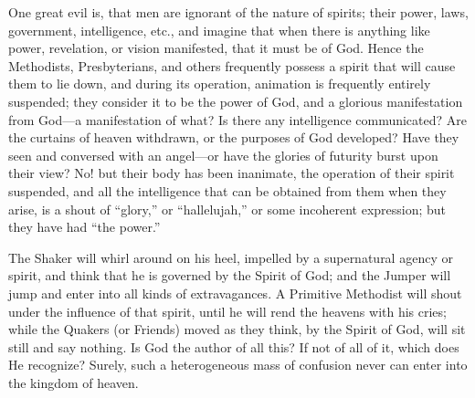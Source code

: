One great evil is, that men are ignorant of the nature of spirits; their power, laws,
government, intelligence, etc., and imagine that when there is anything like power,
revelation, or vision manifested, that it must be of God. Hence the Methodists, Presbyterians,
and others frequently possess a spirit that will cause them to lie down, and during its
operation, animation is frequently entirely suspended; they consider it to be the power of
God, and a glorious manifestation from God—a manifestation of what? Is there any
intelligence communicated? Are the curtains of heaven withdrawn, or the purposes of God
developed? Have they seen and conversed with an angel—or have the glories of futurity
burst upon their view? No! but their body has been inanimate, the operation of their spirit
suspended, and all the intelligence that can be obtained from them when they arise, is a shout
of ``glory,'' or ``hallelujah,'' or some incoherent expression; but they have had ``the power.''

The Shaker will whirl around on his heel, impelled by a supernatural agency or spirit, and
think that he is governed by the Spirit of God; and the Jumper will jump and enter into all
kinds of extravagances. A Primitive Methodist will shout under the influence of that spirit,
until he will rend the heavens with his cries; while the Quakers (or Friends) moved as they
think, by the Spirit of God, will sit still and say nothing. Is God the author of all this? If not
of all of it, which does He recognize? Surely, such a heterogeneous mass of confusion never
can enter into the kingdom of heaven.

